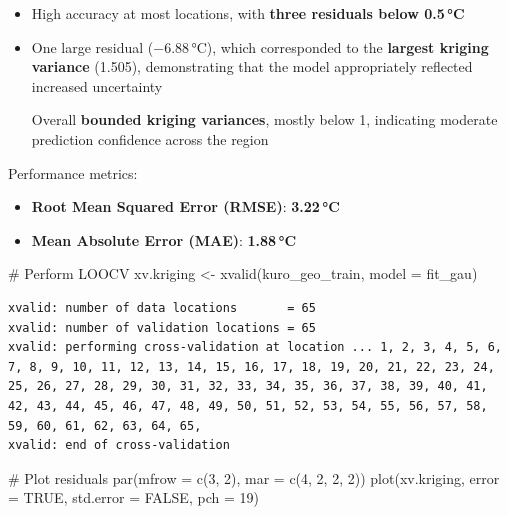 \documentclass[
  11pt,
]{article}
\newenvironment{Shaded}{\begin{snugshade}}{\end{snugshade}}
\newcommand{\AttributeTok}[1]{\textcolor[rgb]{0.40,0.45,0.13}{#1}}
\newcommand{\CommentTok}[1]{\textcolor[rgb]{0.37,0.37,0.37}{#1}}
\newcommand{\ConstantTok}[1]{\textcolor[rgb]{0.56,0.35,0.01}{#1}}
\newcommand{\DecValTok}[1]{\textcolor[rgb]{0.68,0.00,0.00}{#1}}
\newcommand{\FunctionTok}[1]{\textcolor[rgb]{0.28,0.35,0.67}{#1}}
\newcommand{\NormalTok}[1]{\textcolor[rgb]{0.00,0.23,0.31}{#1}}
\newcommand{\OtherTok}[1]{\textcolor[rgb]{0.00,0.23,0.31}{#1}}
\begin{document}
\begin{itemize}
\item
  High accuracy at most locations, with \textbf{three residuals below
  0.5\,°C}
\item
  One large residual (−6.88\,°C), which corresponded to the
  \textbf{largest kriging variance} (1.505), demonstrating that the
  model appropriately reflected increased uncertainty

  Overall \textbf{bounded kriging variances}, mostly below 1, indicating
  moderate prediction confidence across the region
\end{itemize}

Performance metrics:

\begin{itemize}
\item
  \textbf{Root Mean Squared Error (RMSE)}: \textbf{3.22\,°C}
\item
  \textbf{Mean Absolute Error (MAE)}: \textbf{1.88\,°C}
\end{itemize}

\begin{Shaded}
\begin{Highlighting}[]
\CommentTok{\# Perform LOOCV}
\NormalTok{xv.kriging }\OtherTok{\textless{}{-}} \FunctionTok{xvalid}\NormalTok{(kuro\_geo\_train, }\AttributeTok{model =}\NormalTok{ fit\_gau)}
\end{Highlighting}
\end{Shaded}

\begin{verbatim}
xvalid: number of data locations       = 65
xvalid: number of validation locations = 65
xvalid: performing cross-validation at location ... 1, 2, 3, 4, 5, 6, 7, 8, 9, 10, 11, 12, 13, 14, 15, 16, 17, 18, 19, 20, 21, 22, 23, 24, 25, 26, 27, 28, 29, 30, 31, 32, 33, 34, 35, 36, 37, 38, 39, 40, 41, 42, 43, 44, 45, 46, 47, 48, 49, 50, 51, 52, 53, 54, 55, 56, 57, 58, 59, 60, 61, 62, 63, 64, 65, 
xvalid: end of cross-validation
\end{verbatim}

\begin{Shaded}
\begin{Highlighting}[]
\CommentTok{\# Plot residuals}
\FunctionTok{par}\NormalTok{(}\AttributeTok{mfrow =} \FunctionTok{c}\NormalTok{(}\DecValTok{3}\NormalTok{, }\DecValTok{2}\NormalTok{), }\AttributeTok{mar =} \FunctionTok{c}\NormalTok{(}\DecValTok{4}\NormalTok{, }\DecValTok{2}\NormalTok{, }\DecValTok{2}\NormalTok{, }\DecValTok{2}\NormalTok{))}
\FunctionTok{plot}\NormalTok{(xv.kriging, }\AttributeTok{error =} \ConstantTok{TRUE}\NormalTok{, }\AttributeTok{std.error =} \ConstantTok{FALSE}\NormalTok{, }\AttributeTok{pch =} \DecValTok{19}\NormalTok{)}
\end{Highlighting}
\end{Shaded}
\end{document}
